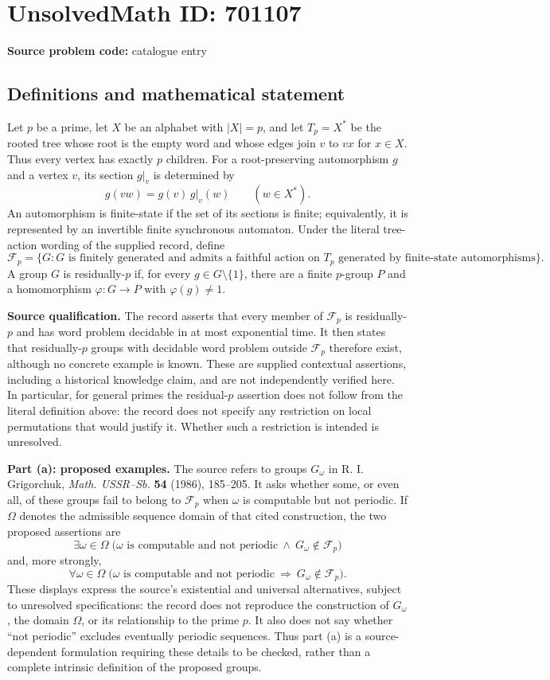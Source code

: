 \documentclass[11pt]{article}
\begin{document}
\section*{UnsolvedMath ID: 701107}
\textbf{Source problem code:} catalogue entry
\subsection{Definitions and mathematical statement}
Let \(p\) be a prime, let \(X\) be an alphabet with \(|X|=p\), and let \(T_p=X^*\) be the rooted tree whose root is the empty word and whose edges join \(v\) to \(vx\) for \(x\in X\). Thus every vertex has exactly \(p\) children. For a root-preserving automorphism \(g\) and a vertex \(v\), its section \(g|_v\) is determined by
\[
 g(vw)=g(v)\,g|_v(w)\qquad(w\in X^*).
\]
An automorphism is finite-state if the set of its sections is finite; equivalently, it is represented by an invertible finite synchronous automaton. Under the literal tree-action wording of the supplied record, define
\[
\mathcal F_p=\{G: G\text{ is finitely generated and admits a faithful action on }T_p\text{ generated by finite-state automorphisms}\}.
\]
A group \(G\) is residually-\(p\) if, for every \(g\in G\setminus\{1\}\), there are a finite \(p\)-group \(P\) and a homomorphism \(\varphi:G\to P\) with \(\varphi(g)\ne1\).

\textbf{Source qualification.} The record asserts that every member of \(\mathcal F_p\) is residually-\(p\) and has word problem decidable in at most exponential time. It then states that residually-\(p\) groups with decidable word problem outside \(\mathcal F_p\) therefore exist, although no concrete example is known. These are supplied contextual assertions, including a historical knowledge claim, and are not independently verified here. In particular, for general primes the residual-\(p\) assertion does not follow from the literal definition above: the record does not specify any restriction on local permutations that would justify it. Whether such a restriction is intended is unresolved.

\textbf{Part (a): proposed examples.} The source refers to groups \(G_\omega\) in R. I. Grigorchuk, \emph{Math. USSR--Sb.} \textbf{54} (1986), 185--205. It asks whether some, or even all, of these groups fail to belong to \(\mathcal F_p\) when \(\omega\) is computable but not periodic. If \(\Omega\) denotes the admissible sequence domain of that cited construction, the two proposed assertions are
\[
\exists\omega\in\Omega\;\bigl(\omega\text{ is computable and not periodic}\ \land\ G_\omega\notin\mathcal F_p\bigr)
\]
and, more strongly,
\[
\forall\omega\in\Omega\;\bigl(\omega\text{ is computable and not periodic}\ \Longrightarrow\ G_\omega\notin\mathcal F_p\bigr).
\]
These displays express the source's existential and universal alternatives, subject to unresolved specifications: the record does not reproduce the construction of \(G_\omega\), the domain \(\Omega\), or its relationship to the prime \(p\). It also does not say whether ``not periodic'' excludes eventually periodic sequences. Thus part (a) is a source-dependent formulation requiring these details to be checked, rather than a complete intrinsic definition of the proposed groups.
\end{document}
